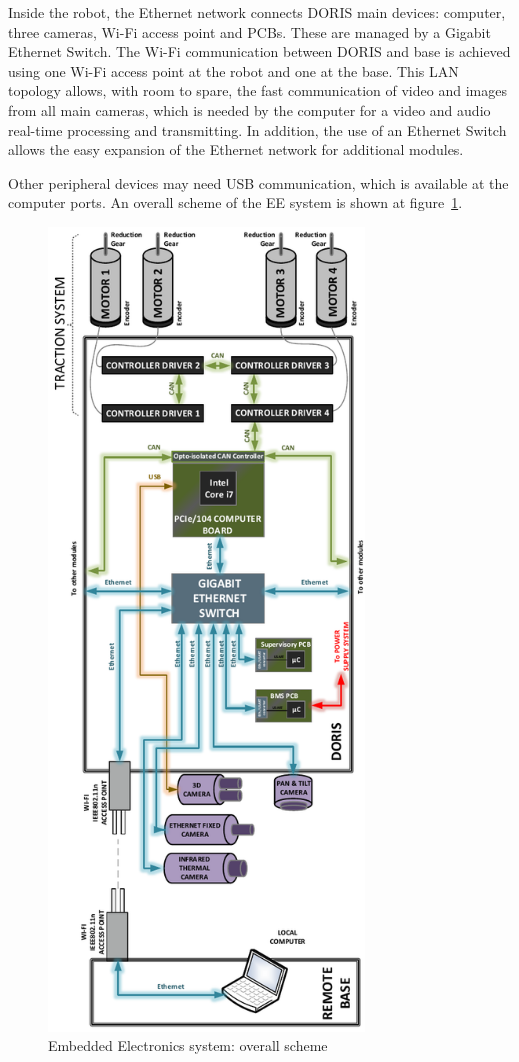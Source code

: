 \documentclass{ifacconf}
\begin{document}
Inside the robot, the Ethernet network connects DORIS main devices: computer,
three cameras, Wi-Fi access point and PCBs. These are managed by a Gigabit
Ethernet Switch. The Wi-Fi communication between DORIS and base is achieved
using one Wi-Fi access point at the robot and one at the base. This LAN
topology allows, with room to spare, the fast communication of video and images
from all main cameras, which is needed by the computer for a video and
audio real-time processing and transmitting. In addition, the use of an Ethernet
Switch allows the easy expansion of the Ethernet network for additional modules.

Other peripheral devices may need USB communication, which is available at the
computer ports. An overall scheme of the EE system is shown at
figure~\ref{fig:EE-Communications}.
\begin{figure}
\begin{center}
\includegraphics[width=8.4cm]{figs/EE-Communications.pdf}    %
\caption{Embedded Electronics system: overall scheme}
\label{fig:EE-Communications}
\end{center}
\end{figure}
\end{document}
